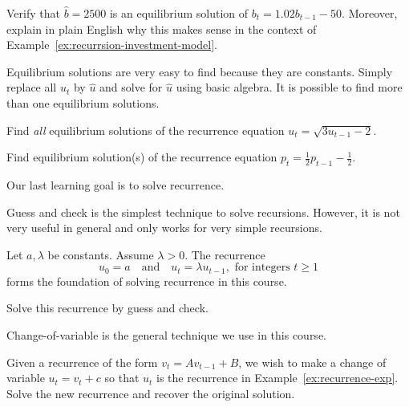 \documentclass[../main.tex]{subfiles}
\begin{document}
\begin{example}
  Verify that \(\hat{b} = 2500\) is an equilibrium solution of \(b_{t} = 1.02 b_{t-1} - 50\).  Moreover, explain in plain English why this makes sense in the context of Example~\ref{ex:recurrsion-investment-model}.
\end{example}

\faStar{} Equilibrium solutions are very easy to find because they are constants. Simply replace all \(u_{t}\) by \(\hat{u}\) and solve for \(\hat{u}\) using basic algebra. It is possible to find more than one equilibrium solutions.

\begin{example}
  Find \emph{all} equilibrium solutions of the recurrence equation \(u_{t} = \sqrt{3 u_{t-1} - 2}\).
\end{example}
\clearpage

\begin{example}
  Find equilibrium solution(s) of the recurrence equation \(p_{t} = \frac{1}{2} p_{t-1} - \frac{1}{2}\).
\end{example}

Our last learning goal is to solve recurrence.

Guess and check is the simplest technique to solve recursions. However, it is not very useful in general and only works for very simple recursions.
\begin{example}[important] \label{ex:recurrence-exp}
  Let \(a,\lambda\) be constants. Assume \(\lambda > 0\). The recurrence 
  \[ 
    u_{0} = a \quad\text{and}\quad u_{t} = \lambda u_{t-1}, \text{ for integers } t \ge 1 
  \] 
  forms the foundation of solving recurrence in this course. 
  
  Solve this recurrence by guess and check.
\end{example}

\clearpage

Change-of-variable is the general technique we use in this course. 

\begin{method} \label{method:recurrence-sub}
  Given a recurrence of the form \(v_{t} = A v_{t-1} + B\), we wish to make a change of variable \(u_{t} = v_{t} + c\) so that \(u_{t}\) is the recurrence in Example~\ref{ex:recurrence-exp}. Solve the new recurrence and recover the original solution.
\end{method}
\end{document}
